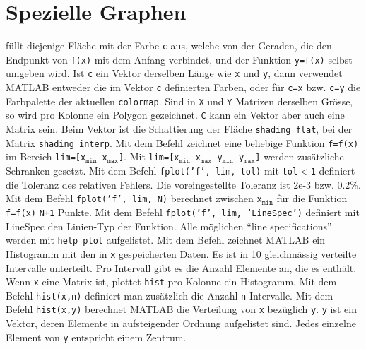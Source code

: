 \section{Spezielle Graphen}
 füllt diejenige Fläche mit der Farbe \texttt{c} aus, welche von der Geraden, die den Endpunkt von \texttt{f(x)} mit dem Anfang verbindet, und der Funktion \texttt{y=f(x)} selbst umgeben wird. Ist \texttt{c} ein Vektor derselben Länge wie \texttt{x} und \texttt{y}, dann verwendet MATLAB entweder die im Vektor \texttt{c} definierten Farben, oder für \texttt{c=x} bzw. \texttt{c=y} die Farbpalette der aktuellen \texttt{colormap}. Sind in  \texttt{X} und \texttt{Y} Matrizen derselben Grösse, so wird pro Kolonne ein Polygon gezeichnet. \texttt{C} kann ein Vektor aber auch eine Matrix sein. Beim Vektor ist die Schattierung der Fläche {\color{red}\texttt{shading flat}}, bei der Matrix {\color{red}\texttt{shading interp}}.
\newline\newline
Mit dem Befehl  zeichnet eine beliebige Funktion \texttt{f=f(x)} im Bereich \texttt{lim=[x$_{\texttt{min}}$ x$_{\texttt{max}}$]}. Mit \texttt{lim=[x$_{\texttt{min}}$ x$_{\texttt{max}}$ y$_{\texttt{min}}$ y$_{\texttt{max}}$]} werden zusätzliche Schranken gesetzt. Mit dem Befehl {\color{red}\texttt{fplot('f', lim, tol)}} mit \texttt{tol$<$1} definiert die Toleranz des relativen Fehlers. Die voreingestellte Toleranz ist 2e-3 bzw. 0.2\%. Mit dem Befehl {\color{red}\texttt{fplot('f', lim, N)}} berechnet zwischen \texttt{x$_{\texttt{min}}$} für die Funktion \texttt{f=f(x)} \texttt{N+1} Punkte. Mit dem Befehl {\color{red}\texttt{fplot('f', lim, 'LineSpec')}} definiert mit LineSpec den Linien-Typ der Funktion. Alle möglichen ``line specifications'' werden mit \texttt{help plot} aufgelistet.
\newline\newline
Mit dem Befehl  zeichnet MATLAB ein Histogramm mit den in \texttt{x} gespeicherten Daten. Es ist in 10 gleichmässig verteilte Intervalle unterteilt. Pro Intervall gibt es die Anzahl Elemente an, die es enthält. Wenn \texttt{x} eine Matrix ist, plottet \texttt{hist} pro Kolonne ein Histogramm. Mit dem Befehl {\color{red}\texttt{hist(x,n)}} definiert man zusätzlich die Anzahl \texttt{n} Intervalle. Mit dem Befehl {\color{red}\texttt{hist(x,y)}} berechnet MATLAB die Verteilung von \texttt{x} bezüglich \texttt{y}. \texttt{y} ist ein Vektor, deren Elemente in aufsteigender Ordnung aufgelistet sind. Jedes einzelne Element von \texttt{y} entspricht einem Zentrum.
